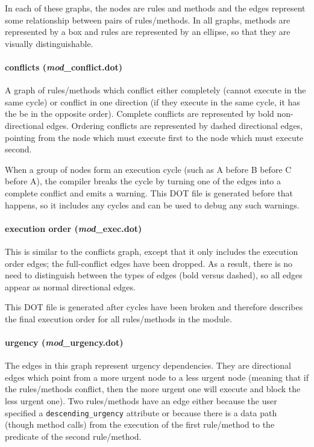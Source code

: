 \documentclass{article}
\newcommand{\te}[1]{\texttt{#1}}
\begin{document}
In each of these graphs, the nodes are rules and methods and the edges
represent some relationship between pairs of rules/methods.  In all
graphs, methods are represented by a box and rules are represented by
an ellipse, so that they are visually distinguishable.

\paragraph{conflicts (\emph{mod}\_conflict.dot)}

A graph of rules/methods which conflict either completely (cannot execute
in the same cycle) or conflict in one direction (if they execute in the
same cycle, it has the be in the opposite order).  Complete conflicts are
represented by bold non-directional edges. Ordering conflicts are
represented by dashed directional edges, pointing from the node which must
execute first to the node which must execute second.

When a group of nodes form an execution cycle (such as A before B before C
before A), the compiler breaks the cycle by turning one of the edges into
a complete conflict and emits a warning.  This DOT file is generated before
that happens, so it includes any cycles and can be used to debug any such
warnings.

\paragraph{execution order (\emph{mod}\_exec.dot)}

This is similar to the conflicts graph, except that it only includes
the execution
order edges; the full-conflict edges have been dropped.  As a result,
there is no need to distinguish between the types of edges (bold versus
dashed), so all edges appear as normal directional edges.

This DOT file is generated after cycles have been broken and therefore
describes the final execution order for all rules/methods in the
module.

\paragraph{urgency (\emph{mod}\_urgency.dot)}
The edges in this graph represent urgency dependencies.  They are
directional edges which point from a more urgent node to a less urgent
node (meaning that if the rules/methods conflict, then the more urgent
one will execute and block the less urgent one).  Two rules/methods
have an edge either because the user specified a \te{descending\_urgency}
attribute or because there is a data path (though method calls) from
the execution of the first rule/method to the predicate of the second
rule/method.
\end{document}
